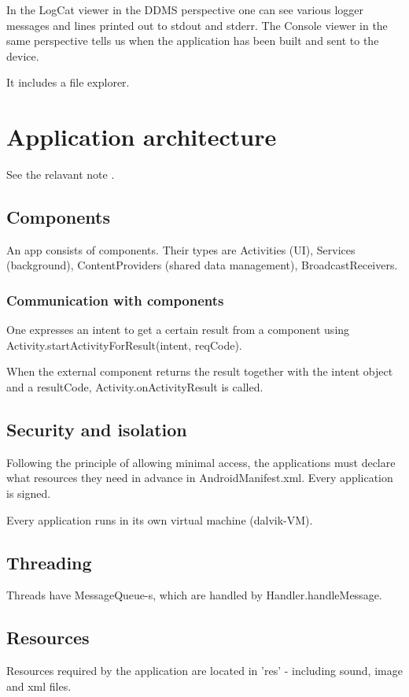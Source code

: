 In the LogCat viewer in the DDMS perspective one can see various logger messages and lines printed out to stdout and stderr. The Console viewer in the same perspective tells us when the application has been built and sent to the device.

It includes a file explorer.

\tbc


\section{Application architecture}
See the relavant note .

\subsection{Components}
An app consists of components. Their types are Activities (UI), Services (background), ContentProviders (shared data management), BroadcastReceivers.

\subsubsection{Communication with components}
One expresses an intent to get a certain result from a component using Activity.startActivityForResult(intent, reqCode).

When the external component returns the result together with the intent object and a resultCode, Activity.onActivityResult is called.

\subsection{Security and isolation}
Following the principle of allowing minimal access, the applications must declare what resources they need in advance in AndroidManifest.xml. Every application is signed.

Every application runs in its own virtual machine (dalvik-VM).

\tbc

\subsection{Threading}
Threads have MessageQueue-s, which are handled by Handler.handleMessage.

\subsection{Resources}
Resources required by the application are located in 'res' - including sound, image and xml files.

